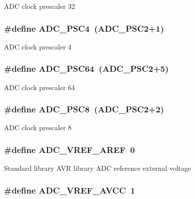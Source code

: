 A\-D\-C clock prescaler 32 \hypertarget{group__ex4__adc_ga6c2340ea20750be3852fb32e629a7091}{
\subsubsection[{A\-D\-C\-\_\-\-P\-S\-C4}]{\setlength{\rightskip}{0pt plus 5cm}\#define A\-D\-C\-\_\-\-P\-S\-C4~({\bf A\-D\-C\-\_\-\-P\-S\-C2}+1)}}\label{group__ex4__adc_ga6c2340ea20750be3852fb32e629a7091}
A\-D\-C clock prescaler 4 \hypertarget{group__ex4__adc_ga20fdb2079b33236cb1c64bbe68677c4d}{
\subsubsection[{A\-D\-C\-\_\-\-P\-S\-C64}]{\setlength{\rightskip}{0pt plus 5cm}\#define A\-D\-C\-\_\-\-P\-S\-C64~({\bf A\-D\-C\-\_\-\-P\-S\-C2}+5)}}\label{group__ex4__adc_ga20fdb2079b33236cb1c64bbe68677c4d}
A\-D\-C clock prescaler 64 \hypertarget{group__ex4__adc_gaaca57247c775b90985187abd9306e7e2}{
\subsubsection[{A\-D\-C\-\_\-\-P\-S\-C8}]{\setlength{\rightskip}{0pt plus 5cm}\#define A\-D\-C\-\_\-\-P\-S\-C8~({\bf A\-D\-C\-\_\-\-P\-S\-C2}+2)}}\label{group__ex4__adc_gaaca57247c775b90985187abd9306e7e2}
A\-D\-C clock prescaler 8 \hypertarget{group__ex4__adc_gabca684824d1a447a7ddb9375efaec794}{
\subsubsection[{A\-D\-C\-\_\-\-V\-R\-E\-F\-\_\-\-A\-R\-E\-F}]{\setlength{\rightskip}{0pt plus 5cm}\#define A\-D\-C\-\_\-\-V\-R\-E\-F\-\_\-\-A\-R\-E\-F~0}}\label{group__ex4__adc_gabca684824d1a447a7ddb9375efaec794}
Standard library A\-V\-R library A\-D\-C reference external voltage \hypertarget{group__ex4__adc_gad8c99ef2e1a54e5ac6ac5f2a46609fdc}{
\subsubsection[{A\-D\-C\-\_\-\-V\-R\-E\-F\-\_\-\-A\-V\-C\-C}]{\setlength{\rightskip}{0pt plus 5cm}\#define A\-D\-C\-\_\-\-V\-R\-E\-F\-\_\-\-A\-V\-C\-C~1}}\label{group__ex4__adc_gad8c99ef2e1a54e5ac6ac5f2a46609fdc}
